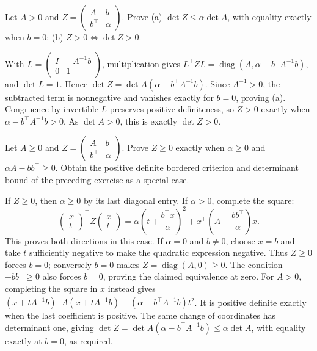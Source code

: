 \begin{problem}\label{ex:12:ineq-ma-23}
Let \(A>0\) and \(Z=\begin{pmatrix}A&b\\b^\top&\alpha\end{pmatrix}\).
Prove (a) \(\det Z\leqslant\alpha\det A\), with equality exactly when
\(b=0\); (b) \(Z>0\iff\det Z>0\).
\end{problem}
\begin{solution}
With \(L=\begin{pmatrix}I&-A^{-1}b\\0&1\end{pmatrix}\), multiplication gives
\(L^\top ZL=\operatorname{diag}(A,\alpha-b^\top A^{-1}b)\), and \(\det L=1\).
Hence \(\det Z=\det A(\alpha-b^\top A^{-1}b)\).
Since \(A^{-1}>0\), the subtracted term is nonnegative and vanishes
exactly for \(b=0\), proving (a).
Congruence by invertible \(L\) preserves positive definiteness, so \(Z>0\)
exactly when \(\alpha-b^\top A^{-1}b>0\). As \(\det A>0\), this is
exactly \(\det Z>0\).
\end{solution}

\begin{problem}\label{ex:12:ineq-ma-24}
Let \(A\geqslant0\) and \(Z=\begin{pmatrix}A&b\\b^\top&\alpha\end{pmatrix}\).
Prove \(Z\geqslant0\) exactly when \(\alpha\geqslant0\) and
\(\alpha A-bb^\top\geqslant0\). Obtain the positive definite bordered
criterion and determinant bound of the preceding exercise as a special case.
\end{problem}
\begin{solution}
If \(Z\geqslant0\), then \(\alpha\geqslant0\) by its last diagonal entry.
If \(\alpha>0\), complete the square:
\[
\begin{pmatrix}x\\t\end{pmatrix}^{\!\top}Z\begin{pmatrix}x\\t\end{pmatrix}
=\alpha\left(t+\frac{b^\top x}{\alpha}\right)^2
+x^\top\left(A-\frac{bb^\top}{\alpha}\right)x.
\]
This proves both directions in this case. If \(\alpha=0\) and \(b\ne0\),
choose \(x=b\) and take \(t\) sufficiently negative to make the quadratic
expression negative. Thus \(Z\geqslant0\) forces \(b=0\); conversely
\(b=0\) makes \(Z=\operatorname{diag}(A,0)\geqslant0\).
The condition \(-bb^\top\geqslant0\) also forces \(b=0\), proving the
claimed equivalence at zero.
For \(A>0\), completing the square in \(x\) instead gives
\((x+tA^{-1}b)^\top A(x+tA^{-1}b)+(\alpha-b^\top A^{-1}b)t^2\).
It is positive definite exactly when the last coefficient is positive.
The same change of coordinates has determinant one, giving
\(\det Z=\det A(\alpha-b^\top A^{-1}b)\leqslant\alpha\det A\),
with equality exactly at \(b=0\), as required.
\end{solution}

